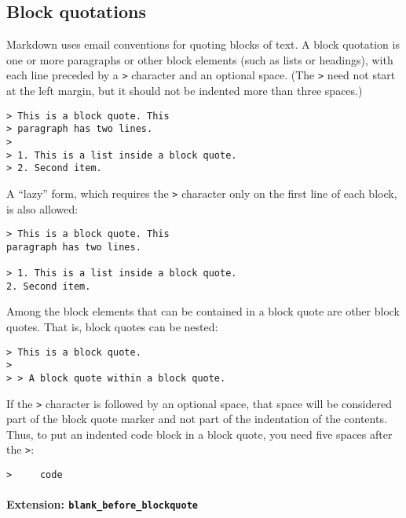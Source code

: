 \documentclass[
  a4paper,
]{article}
\begin{document}
\hypertarget{block-quotations}{%
\subsection{Block quotations}\label{block-quotations}}

Markdown uses email conventions for quoting blocks of text. A block
quotation is one or more paragraphs or other block elements (such as
lists or headings), with each line preceded by a \texttt{\textgreater{}}
character and an optional space. (The \texttt{\textgreater{}} need not
start at the left margin, but it should not be indented more than three
spaces.)

\begin{verbatim}
> This is a block quote. This
> paragraph has two lines.
>
> 1. This is a list inside a block quote.
> 2. Second item.
\end{verbatim}

A ``lazy'' form, which requires the \texttt{\textgreater{}} character
only on the first line of each block, is also allowed:

\begin{verbatim}
> This is a block quote. This
paragraph has two lines.

> 1. This is a list inside a block quote.
2. Second item.
\end{verbatim}

Among the block elements that can be contained in a block quote are
other block quotes. That is, block quotes can be nested:

\begin{verbatim}
> This is a block quote.
>
> > A block quote within a block quote.
\end{verbatim}

If the \texttt{\textgreater{}} character is followed by an optional
space, that space will be considered part of the block quote marker and
not part of the indentation of the contents. Thus, to put an indented
code block in a block quote, you need five spaces after the
\texttt{\textgreater{}}:

\begin{verbatim}
>     code
\end{verbatim}

\hypertarget{extension-blank_before_blockquote}{%
\paragraph{\texorpdfstring{Extension:
\texttt{blank\_before\_blockquote}}{Extension: blank\_before\_blockquote}}\label{extension-blank_before_blockquote}}
\end{document}
